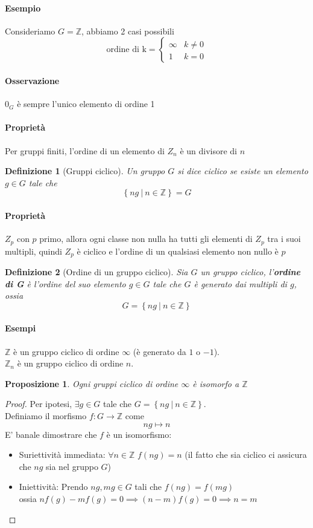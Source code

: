 \documentclass[a4paper]{report}
\newtheorem{proposition}{Proposizione}
\newtheorem{definition}{Definizione}
\newcommand{\Z}{\ensuremath{\mathbb{Z}}}
\newcommand{\ra}{\ensuremath{\rightarrow}}
\newcommand{\setst}[2]{\ensuremath{\left\{{#1}\ |\ {#2}\right\}}}
\begin{document}
\paragraph{Esempio}
Consideriamo $G=\Z$, abbiamo 2 casi possibili
\[
    \text{ordine di k}=\begin{cases}
        \infty & k\neq 0 \\ 1 & k=0
    \end{cases}
\]
\paragraph{Osservazione} $0_G$ è sempre l'unico elemento di ordine 1
\paragraph{Proprietà} Per gruppi finiti, l'ordine di un elemento di $Z_n$ è un divisore di $n$
\begin{definition}[Gruppi ciclico]
    Un gruppo $G$ si dice ciclico se esiste un elemento $g\in G$ tale che
    \[
        \setst{ng}{n\in\Z}=G
    \]
\end{definition}
\paragraph{Proprietà} $Z_p$ con $p$ primo, allora ogni classe non nulla ha tutti gli elementi di $Z_p$ tra i suoi multipli, quindi $Z_p$ è ciclico e l'ordine di un qualsiasi elemento non nullo è $p$
\begin{definition}[Ordine di un gruppo ciclico]
    Sia $G$ un gruppo ciclico, l'\textbf{ordine di G} è l'ordine del suo elemento $g\in G$ tale che $G$ è generato dai multipli di $g$, ossia
    \[
        G=\setst{ng}{n\in\Z}
    \]
\end{definition}
\paragraph{Esempi}
$\Z$ è un gruppo ciclico di ordine $\infty$ (è generato da $1$ o $-1$).\\
$\Z_n$ è un gruppo ciclico di ordine $n$.
\begin{proposition}
    Ogni gruppi ciclico di ordine $\infty$ è isomorfo a $\Z$
\end{proposition}
\begin{proof}
    Per ipotesi, $\exists g\in G$ tale che $G=\setst{ng}{n\in\Z}$.\\
    Definiamo il morfismo $f:G\ra\Z$ come
    \[
        ng\mapsto n
    \]
    E' banale dimostrare che $f$ è un isomorfismo:
    \begin{itemize}
        \item Suriettività immediata: $\forall n\in\Z$ $f(ng)=n$ (il fatto che sia ciclico ci assicura che $ng$ sia nel gruppo $G$)
        \item Iniettività: Prendo $ng,mg\in G$ tali che $f(ng)=f(mg)$ \\ossia $nf(g)-mf(g)=0\implies(n-m)f(g)=0\implies n=m$
    \end{itemize}
\end{proof}
\end{document}
